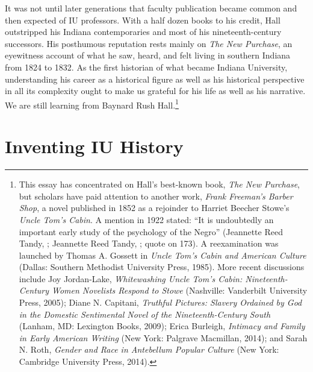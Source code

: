 \documentclass[
  american,
  letterpaper,
]{scrreprt}
\begin{document}
It was not until later generations that faculty publication became
common and then expected of IU professors. With a half dozen books to
his credit, Hall outstripped his Indiana contemporaries and most of his
nineteenth-century successors. His posthumous reputation rests mainly on
\emph{The New Purchase}, an eyewitness account of what he saw, heard,
and felt living in southern Indiana from 1824 to 1832. As the first
historian of what became Indiana University, understanding his career as
a historical figure as well as his historical perspective in all its
complexity ought to make us grateful for his life as well as his
narrative. We are still learning from Baynard Rush Hall.\footnote{This
  essay has concentrated on Hall's best-known book, \emph{The New
  Purchase}, but scholars have paid attention to another work,
  \emph{Frank Freeman's Barber Shop}, a novel published in 1852 as a
  rejoinder to Harriet Beecher Stowe's \emph{Uncle Tom's Cabin}. A
  mention in 1922 stated: ``It is undoubtedly an important early study
  of the psychology of the Negro'' (Jeannette Reed Tandy,
  ; Jeannette Reed Tandy,
  ; quote on 173). A
  reexamination was launched by Thomas A. Gossett in \emph{Uncle Tom's
  Cabin and American Culture} (Dallas: Southern Methodist University
  Press, 1985). More recent discussions include Joy Jordan-Lake,
  \emph{Whitewashing Uncle Tom's Cabin: Nineteenth-Century Women
  Novelists Respond to Stowe} (Nashville: Vanderbilt University Press,
  2005); Diane N. Capitani, \emph{Truthful Pictures: Slavery Ordained by
  God in the Domestic Sentimental Novel of the Nineteenth-Century South}
  (Lanham, MD: Lexington Books, 2009); Erica Burleigh, \emph{Intimacy
  and Family in Early American Writing} (New York: Palgrave Macmillan,
  2014); and Sarah N. Roth, \emph{Gender and Race in Antebellum Popular
  Culture} (New York: Cambridge University Press, 2014).}


\chapter{Inventing IU History}\label{sec-three}
\end{document}

